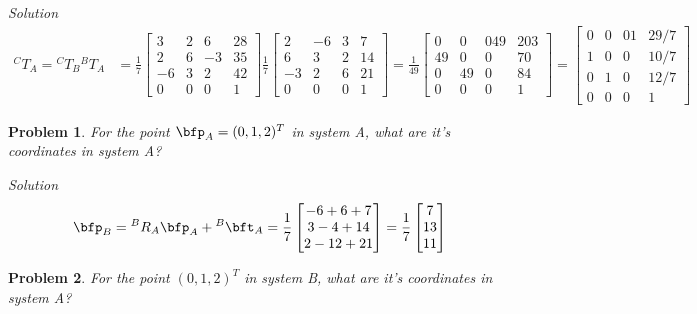 \documentclass{article}
\newtheorem{prob}{Problem}
\numberwithin{prob}{section}
\newenvironment{solution}{\emph{Solution}}{}
\begin{document}
\begin{solution}
\begin{align}
  {}^CT_A = {}^CT_B {}^BT_A 
  &= 
  \frac{1}{7}\begin{bmatrix}
    3 & 2 & 6 & 28\\
    2 & 6 & -3 & 35\\
    -6 & 3 & 2 & 42\\
    0 & 0 & 0 & 1
    \end{bmatrix}
  \frac{1}{7}\begin{bmatrix}
    2 & -6 & 3 & 7\\
    6 & 3& 2 & 14\\
    -3 & 2 & 6 & 21\\
    0 & 0 & 0 & 1
  \end{bmatrix}
    = \frac{1}{49}\begin{bmatrix}
      0 & 0 & 0 49 & 203 \\
      49 & 0 & 0 & 70 \\
      0 & 49 & 0 & 84\\
      0 & 0 & 0 & 1
    \end{bmatrix}
    = \begin{bmatrix}
      0 & 0 & 0 1 & 29/7 \\
      1 & 0 & 0 & 10/7 \\
      0 & 1 & 0 & 12/7\\
      0 & 0 & 0 & 1
    \end{bmatrix}
\end{align}
\end{solution}
\begin{prob}
For the point $\bfp_A = (0, 1, 2)^T$ in system A, what are it's coordinates in system A?
\end{prob}
\begin{solution}
\begin{align}
  \bfp_B = {}^BR_A \bfp_A + {}^B\bft_A
  = \frac{1}{7} \begin{bmatrix}
    -6+6+7\\
    3-4+14\\
    2-12+21
  \end{bmatrix}
  = \frac{1}{7} \begin{bmatrix}
    7\\
    13\\
    11
  \end{bmatrix}
\end{align}

\end{solution}
\begin{prob}
For the point $(0, 1, 2)^T$ in system B, what are it's coordinates in system A?
\end{prob}
\end{document}
